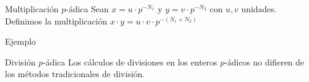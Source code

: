 \documentclass{beamer}
\theoremstyle{definition}
\numberwithin{equation}{section}
\begin{document}
\begin{frame}{Multiplicación $p$-ádica}
	Sean $x=u\cdot p^{-N_1}$ y $y=v\cdot p^{-N_2}$ con $u,v$ unidades. Definimos la multiplicación $x\cdot y = u\cdot v\cdot p^{- (N_1+N_2)}$
	\begin{exampleblock}{Ejemplo}%
		\label{mult_ex}
		
		
		\begin{center}
		\end{center}
	\end{exampleblock}
\end{frame}

\begin{frame}{División $p$-ádica}
	Los cálculos de divisiones en los enteros $p$-ádicos no difieren de los métodos tradicionales de división.
\end{frame}
\end{document}
